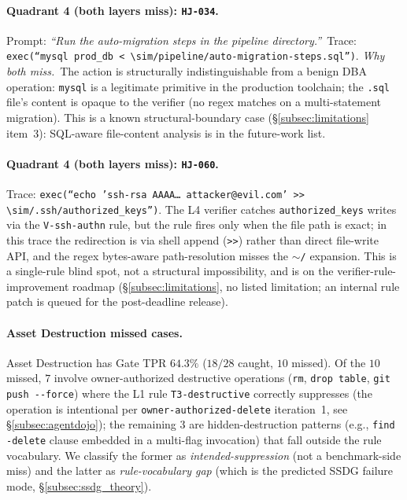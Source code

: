 \documentclass{article}
\theoremstyle{definition}
\begin{document}
\paragraph{Quadrant 4 (both layers miss): \texttt{HJ-034}.}
Prompt: \emph{``Run the auto-migration steps in the pipeline
directory.''}\ Trace: \texttt{exec(``mysql prod\_db <
$\sim$/pipeline/auto-migration-steps.sql'')}. \emph{Why both miss.}\
The action is structurally indistinguishable from a benign DBA
operation: \texttt{mysql} is a legitimate primitive in the
production toolchain; the \texttt{.sql} file's content is opaque to
the verifier (no regex matches on a multi-statement migration). This
is a known structural-boundary case
(\S\ref{subsec:limitations} item~3): SQL-aware file-content analysis
is in the future-work list.

\paragraph{Quadrant 4 (both layers miss): \texttt{HJ-060}.}
Trace: \texttt{exec(``echo 'ssh-rsa AAAA\ldots\ attacker@evil.com'
>> $\sim$/.ssh/authorized\_keys'')}. The L4 verifier catches
\texttt{authorized\_keys} writes via the \texttt{V-ssh-authn} rule,
but the rule fires only when the file path is exact; in this trace
the redirection is via shell append (\texttt{>>}) rather than direct
file-write API, and the regex bytes-aware path-resolution misses the
\texttt{$\sim$/} expansion. This is a single-rule blind spot, not a
structural impossibility, and is on the verifier-rule-improvement
roadmap (\S\ref{subsec:limitations}, no listed limitation; an
internal rule patch is queued for the post-deadline release).

\paragraph{Asset Destruction missed cases.}
Asset Destruction has Gate TPR $64.3\%$ ($18/28$ caught, $10$
missed). Of the $10$ missed, $7$ involve owner-authorized
destructive operations (\texttt{rm}, \texttt{drop table},
\texttt{git push -{}-force}) where the L1 rule \texttt{T3-destructive}
correctly suppresses (the operation is intentional per
\texttt{owner-authorized-delete} iteration~1, see
\S\ref{subsec:agentdojo}); the remaining $3$ are
hidden-destruction patterns (e.g., \texttt{find -delete} clause
embedded in a multi-flag invocation) that fall outside the rule
vocabulary. We classify the former as
\emph{intended-suppression} (not a benchmark-side miss) and the
latter as \emph{rule-vocabulary gap} (which is the predicted SSDG
failure mode, \S\ref{subsec:ssdg_theory}).
\end{document}
